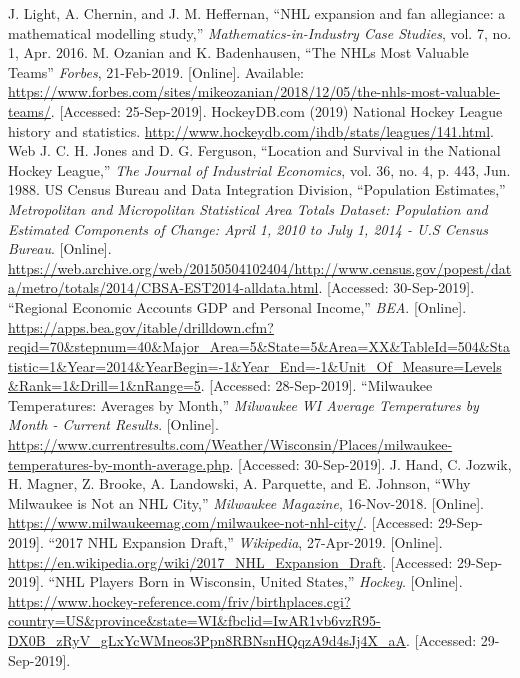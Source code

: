 \documentclass[11pt]{report}            %
\begin{document}
\begin{thebibliography}{9}
 J. Light, A. Chernin, and J. M. Heffernan, ``NHL expansion and fan allegiance: a mathematical modelling study,” \textit{Mathematics-in-Industry Case Studies}, vol. 7, no. 1, Apr. 2016.
 M. Ozanian and K. Badenhausen, ``The NHLs Most Valuable Teams” \textit{Forbes}, 21-Feb-2019. [Online]. Available: \url{https://www.forbes.com/sites/mikeozanian/2018/12/05/the-nhls-most-valuable-teams/}. [Accessed: 25-Sep-2019].
  HockeyDB.com (2019) National Hockey League history and statistics. \url{http://www.hockeydb.com/ihdb/stats/leagues/141.html}. Web
J. C. H. Jones and D. G. Ferguson, ``Location and Survival in the National Hockey League,” \textit{The Journal of Industrial Economics}, vol. 36, no. 4, p. 443, Jun. 1988.
 US Census Bureau and Data Integration Division, ``Population Estimates,” \textit{Metropolitan and Micropolitan Statistical Area Totals Dataset: Population and Estimated Components of Change: April 1, 2010 to July 1, 2014 - U.S Census Bureau}. [Online]. \url{https://web.archive.org/web/20150504102404/http://www.census.gov/popest/data/metro/totals/2014/CBSA-EST2014-alldata.html}. [Accessed: 30-Sep-2019].
 ``Regional Economic Accounts GDP and Personal Income,” \textit{BEA}. [Online]. \url{https://apps.bea.gov/itable/drilldown.cfm?reqid=70&stepnum=40&Major_Area=5&State=5&Area=XX&TableId=504&Statistic=1&Year=2014&YearBegin=-1&Year_End=-1&Unit_Of_Measure=Levels&Rank=1&Drill=1&nRange=5}. [Accessed: 28-Sep-2019].
 ``Milwaukee Temperatures: Averages by Month,” \textit{Milwaukee WI Average Temperatures by Month - Current Results}. [Online]. \url{https://www.currentresults.com/Weather/Wisconsin/Places/milwaukee-temperatures-by-month-average.php}. [Accessed: 30-Sep-2019].
 J. Hand, C. Jozwik, H. Magner, Z. Brooke, A. Landowski, A. Parquette, and E. Johnson, ``Why Milwaukee is Not an NHL City,” \textit{Milwaukee Magazine}, 16-Nov-2018. [Online]. \url{https://www.milwaukeemag.com/milwaukee-not-nhl-city/}. [Accessed: 29-Sep-2019].
 ``2017 NHL Expansion Draft,” \textit{Wikipedia}, 27-Apr-2019. [Online]. \url{https://en.wikipedia.org/wiki/2017_NHL_Expansion_Draft}. [Accessed: 29-Sep-2019].
 ``NHL Players Born in Wisconsin, United States,” \textit{Hockey}. [Online]. \url{https://www.hockey-reference.com/friv/birthplaces.cgi?country=US&province&state=WI&fbclid=IwAR1vb6vzR95-DX0B_zRyV_gLxYcWMneos3Ppn8RBNsnHQqzA9d4sJj4X_aA}. [Accessed: 29-Sep-2019].
\end{thebibliography}
\end{document}
